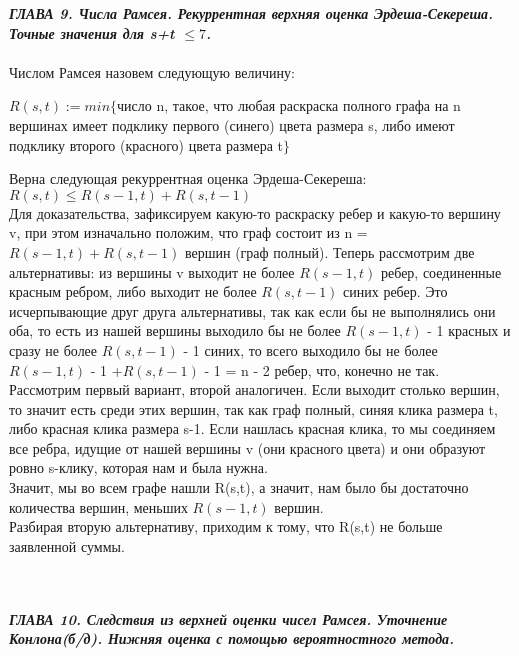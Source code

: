 \documentclass[12pt]{article}
\begin{document}
\textbf{\textit{ГЛАВА 9. Числа Рамсея. Рекуррентная верхняя оценка Эрдеша-Секереша. Точные значения для s+t \(\leq 7\).}}
\\
\\

Числом Рамсея назовем следующую величину:

$R(s,t) := min\{$число n, такое, что любая раскраска полного графа на n вершинах имеет подклику первого (синего) цвета размера s, либо имеют подклику второго (красного) цвета размера t$\}$ 

Верна следующая рекуррентная оценка Эрдеша-Секереша:\\

\(R(s, t) \leq R(s-1, t) + R(s, t-1) \)\\

Для доказательства, зафиксируем какую-то раскраску ребер и какую-то вершину v, при этом изначально положим, что граф состоит из n = $R(s-1, t) + R(s, t-1)$  вершин (граф полный).
Теперь рассмотрим две альтернативы: из вершины v выходит не более $R(s-1, t) $ ребер, соединенные красным ребром, либо выходит не более $R(s, t-1)$ синих ребер. Это исчерпывающие друг друга альтернативы, так как если бы не выполнялись они оба, то есть из нашей вершины выходило бы не более $R(s-1, t) $ - 1 красных  и сразу не более $R(s, t-1)$ - 1 синих, то всего выходило бы не более  $R(s-1, t) $ - 1  +$R(s, t-1)$ - 1 = n - 2 ребер, что, конечно не так. \\

Рассмотрим первый вариант, второй аналогичен. 
Если выходит столько вершин, то значит есть среди этих вершин, так как граф полный, синяя клика размера t, либо красная клика размера s-1. Если нашлась красная клика, то мы соединяем все ребра, идущие от нашей вершины v (они красного цвета) и они образуют ровно s-клику, которая нам и была нужна.\\

Значит, мы во всем графе нашли R(s,t), а значит, нам было бы достаточно количества вершин, меньших $R(s-1, t) $ вершин.\\

Разбирая вторую альтернативу, приходим к тому, что R(s,t) не больше заявленной суммы.

\\
\newpage
\\
\textbf{\textit{ГЛАВА 10. Следствия из верхней оценки чисел Рамсея. Уточнение Конлона(б/д). Нижняя оценка с помощью вероятностного метода.}}
\\
\\
\end{document}
